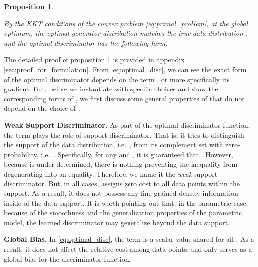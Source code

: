 \documentclass[a4paper]{article}
\newtheorem{proposition}{Proposition}[section]
\begin{document}
\begin{proposition}
\label{thm:general_optimal_disc}

By the KKT conditions of the convex problem \eqref{eq:primal_problem}, at the global optimum, the optimal generator distribution  matches the true data distribution , and the optimal discriminator  has the following form:

	
\end{proposition}

The detailed proof of proposition \ref{thm:general_optimal_disc} is provided in appendix \ref{sec:proof_for_formulation}. 
From \eqref{eq:optimal_disc}, we can see the exact form of the optimal discriminator depends on the term , or more specifically its gradient.
But, before we instantiate  with specific choices and show the corresponding forms of , we first discuss some general properties of  that do not depend on the choice of .

\textbf{Weak Support Discriminator.} As part of the optimal discriminator function, the term  plays the role of support discriminator. 
That is, it tries to distinguish the support of the data distribution, i.e.~, from its complement set with zero-probability, i.e.~.
Specifically, for any  and , it is guaranteed that .
However, because  is under-determined, there is nothing preventing the inequality from degenerating into an equality.
Therefore, we name it the \textit{weak} support discriminator.
But, in all cases,  assigns zero cost to all data points within the support.
As a result, it does not possess any fine-grained density information inside of the data support.
It is worth pointing out that, in the parametric case, because of the smoothness and the generalization properties of the parametric model, the learned discriminator may generalize beyond the data support.

\textbf{Global Bias.} In \eqref{eq:optimal_disc}, the term  is a scalar value shared for all .
As a result, it does not affect the relative cost among data points, and only serves as a global bias for the discriminator function.
\end{document}
